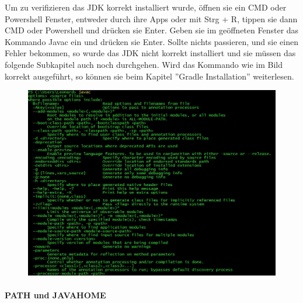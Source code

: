 \documentclass[fontsize=12pt,paper=a4,twoside]{scrartcl}
\begin{document}
Um zu verifizieren das JDK korrekt installiert wurde, öffnen sie ein CMD oder Powershell Fenster, entweder durch ihre Apps oder mit Strg + R, tippen sie dann CMD oder Powershell und drücken sie Enter. Geben sie im geöffneten Fenster das Kommando Javac ein und drücken sie Enter. Sollte nichts passieren, und sie einen Fehler bekommen, so wurde das JDK nicht korrekt installiert und sie müssen das folgende Subkapitel auch noch durchgehen. Wird das Kommando wie im Bild korrekt ausgeführt, so können sie beim Kapitel ''Gradle Installation'' weiterlesen. 

\begin{figure}[h!]
\centering
\includegraphics[width=\linewidth]{JavacWindows.JPG}
\end{figure}


\newpage
\paragraph{PATH und JAVA\textunderscore HOME}
\end{document}
